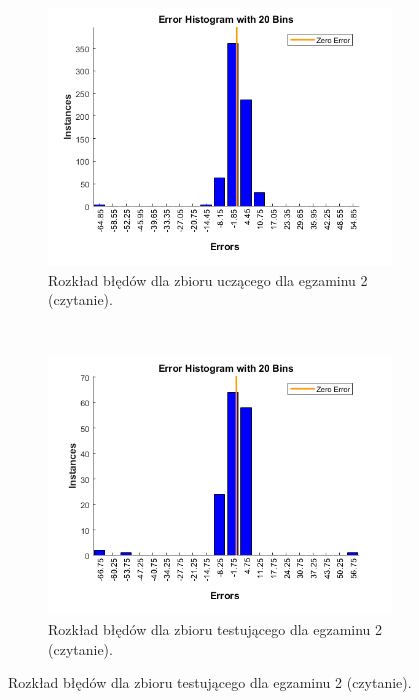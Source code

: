 \documentclass[12pt]{article}
\begin{document}
\begin{figure}[H]
\centering
\begin{subfigure}[t]{0.48\textwidth} 
\centering
\includegraphics[width=\textwidth]{hist_exam_2_learn.png}
\caption{Rozkład błędów dla zbioru uczącego dla egzaminu 2  (czytanie).}
\end{subfigure}
~~
\begin{subfigure}[t]{0.48\textwidth} 
\centering
\includegraphics[width=\textwidth]{hist_exam_2_test.png}
\caption{Rozkład błędów dla zbioru testującego dla egzaminu 2  (czytanie).}
\end{subfigure}


\end{figure}
\end{document}
